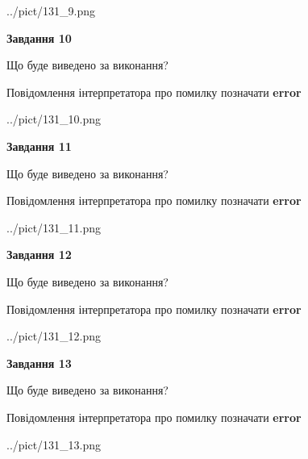 \documentclass[11pt, ukrainian]{article}
\begin{document}
{\begin {large}
\begin{center}
	{../pict/131_9.png}
\end{center}
\newpage

{\begin {center}\textbf{Завдання 10}\end {center}}\par
Що буде виведено за виконання? \par
Повідомлення інтерпретатора про помилку позначати \textbf{error}

\begin{center}
	{../pict/131_10.png}
\end{center}
\newpage

{\begin {center}\textbf{Завдання 11}\end {center}}\par
Що буде виведено за виконання? \par
Повідомлення інтерпретатора про помилку позначати \textbf{error}

\begin{center}
	{../pict/131_11.png}
\end{center}
\newpage

{\begin {center}\textbf{Завдання 12}\end {center}}\par
Що буде виведено за виконання? \par
Повідомлення інтерпретатора про помилку позначати \textbf{error}

\begin{center}
	{../pict/131_12.png}
\end{center}
\newpage

{\begin {center}\textbf{Завдання 13}\end {center}}\par
Що буде виведено за виконання? \par
Повідомлення інтерпретатора про помилку позначати \textbf{error}

\begin{center}
	{../pict/131_13.png}
\end{center}
\newpage


\end{large}}
\end{document}
